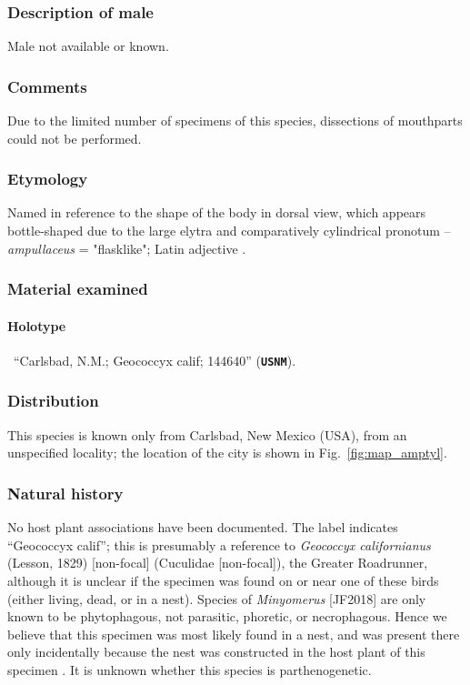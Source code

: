 \documentclass[fleqn,10pt,lineno]{wlpeerj} %
\begin{document}
		\subsubsection*{Description of male}
			Male not available or known.
		\subsubsection*{Comments}
			Due to the limited number of specimens of this species, dissections of mouthparts could not be performed.
		\subsubsection*{Etymology}
			Named in reference to the shape of the body in dorsal view, which appears bottle-shaped due to the large elytra and comparatively cylindrical pronotum -- \textit{ampullaceus} = "flasklike"; Latin adjective \citep{brown1956}.
		\subsubsection*{Material examined}
			\paragraph{Holotype}
				\female~``Carlsbad, N.M.; Geococcyx calif; 144640'' (\texttt{\textbf{USNM}}).
		\subsubsection*{Distribution}
			This species is known only from Carlsbad, New Mexico (USA), from an unspecified locality; the location of the city is shown in Fig.~\ref{fig:map_amptyl}.
		\subsubsection*{Natural history}
			No host plant associations have been documented.
			The label indicates ``Geococcyx calif''; this is presumably a reference to \textit{Geococcyx californianus} (Lesson, 1829) [non-focal] (Cuculidae [non-focal]), the Greater Roadrunner, although it is unclear if the specimen was found on or near one of these birds (either living, dead, or in a nest).
			Species of \textit{Minyomerus} [JF2018] are only known to be phytophagous, not parasitic, phoretic, or necrophagous. Hence we believe that this specimen was most likely found in a nest, and was present there only incidentally because the nest was constructed in the host plant of this specimen \citep{jansen2015}.
			It is unknown whether this species is parthenogenetic.
			
\end{document}
